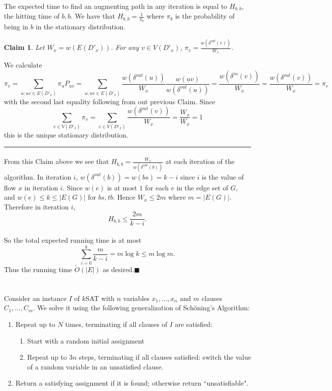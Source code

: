 \documentclass[letterpaper,12pt,oneside,onecolumn]{article}
\newenvironment{proof}{{\bf Proof:  }}{\hfill\rule{2mm}{2mm}}
\newtheorem{claim}[fact]{Claim}
\begin{document}
\paragraph{}
The expected time to find an augmenting path in any iteration is equal to $H_{b,b}$, the hitting time of $b,b$. We have that $H_{b,b} = \frac{1}{\pi_b}$ where $\pi_b$ is the probability of being in $b$ in the stationary distribution.
\begin{claim}
	Let $W_x = w(E(D'_x))$. For any $v \in V(D'_x)$, $\pi_v = \frac{w(\delta^{out}(v))}{W_x}$.
\end{claim}
\begin{proof}
	We calculate
	$$\pi_v = \sum_{u: uv \in E(D'_x)} \pi_uP_{uv} = \sum_{u:uv \in E(D'_x)} \frac{w(\delta^{out}(u))}{W_x}\frac{w(uv)}{w(\delta^{out}(u))} = \frac{w(\delta^{in}(v))}{W_x} = \frac{w(\delta^{out}(v))}{W_x} = \pi_v$$
	with the second last equality following from out previous Claim. Since 
	$$\sum_{v \in V(D'_x)} \pi_v = \sum_{v\in V(D'_x)} \frac{w(\delta^{out}(v))}{W_x} = \frac{W_x}{W_x} = 1$$
	this is the unique stationary distribution.
\end{proof}
\paragraph{}
From this Claim above we see that $H_{b,b} = \frac{W_x}{w(\delta^{out}(b))}$ at each iteration of the algorithm.
In iteration $i$, $w(\delta^{out}(b)) = w(bs) = k-i$ since $i$ is the value of flow $x$ in iteration $i$. Since $w(e)$ is at most $1$ for each $e$ in the edge set of $G$, and $w(e) \leq k\leq |E(G)|$ for $bs, tb$. Hence $W_x \leq 2m$ where $m = |E(G)|$. Therefore in iteration $i$,
$$H_{b,b} \leq \frac{2m}{k-i}.$$
\paragraph{}
So the total expected running time is at most
$$\sum_{i=0}^k\frac{m}{k-i} = m\log k \leq m\log m.$$
Thus the running time $\tilde{O}(|E|)$ as desired.$\blacksquare$
\newpage
\section{}
\paragraph{}
Consider an instance $I$ of $k$SAT with $n$ variables $x_1,\dots,x_n$ and $m$ clauses $C_1, \dots, C_m$. We solve it using the following generalization of Sch\"oning's Algorithm:
\begin{enumerate}
	\item Repeat up to $N$ times, terminating if all clauses of $I$ are satisfied:
	\begin{enumerate}
		\item Start with a random initial assignment
		\item Repeat up to $3n$ steps, terminating if all clauses satisfied: switch the value of a random variable in an unsatisfied clause.
	\end{enumerate}
	\item Return a satisfying assignment if it is found; otherwise return ``unsatisfiable".
\end{enumerate}
\end{document}
